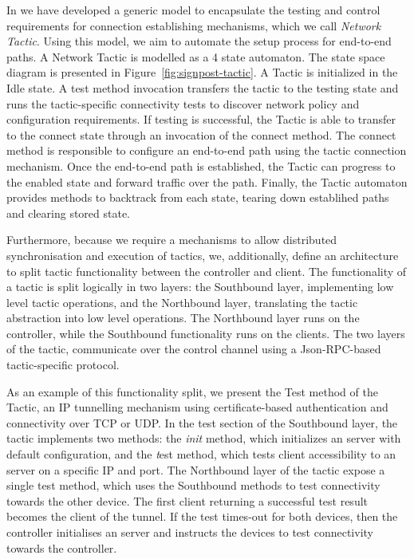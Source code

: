 In \signpost  we have developed a generic model to encapsulate the testing and
control requirements for connection establishing mechanisms, which we call {\it
  Network Tactic}. Using this model, we aim to automate the setup process for
end-to-end paths.  A \signpost Network Tactic is modelled as a 4 state
automaton.  The state space diagram is presented in
Figure~\ref{fig:signpost-tactic}. A Tactic is initialized in the Idle state. A test
method invocation transfers the tactic to the testing state and runs the
tactic-specific connectivity tests to discover network policy and configuration
requirements.  If testing is successful, the Tactic is able to transfer to the
connect state through an invocation of the connect method. The connect method is
responsible to configure an end-to-end path using the tactic connection
mechanism. Once the end-to-end path is established, the Tactic can progress to the
enabled state and forward traffic over the path.  Finally, the Tactic automaton
provides methods to backtrack from each state, tearing down establihed paths and
clearing stored state. 

Furthermore, because we require a mechanisms to allow distributed
synchronisation and execution of tactics, we, additionally, define an
architecture to split tactic functionality between the \signpost controller and
client.  The functionality of a \signpost tactic is split logically in two
layers: the Southbound layer, implementing low level tactic operations, and the
Northbound layer, translating the tactic abstraction into low level operations.
The Northbound layer runs on the \signpost controller, while the
Southbound functionality runs on the \signpost clients.  The two layers of the
tactic, communicate over the control channel using a Json-RPC-based 
tactic-specific protocol. 

As an example of this functionality split, we present the Test method of the
\openvpn Tactic, an IP tunnelling mechanism using certificate-based
authentication and connectivity over TCP or UDP\@. In the test section of the
Southbound layer, the tactic implements two methods: the {\it init} method,
which initializes an \openvpn
server with default configuration, and the {\emph test} method, which tests client accessibility to
an \openvpn server on a specific IP and port. The Northbound layer of the tactic
expose a single test method, which uses the Southbound methods to
test \openvpn connectivity towards the other device. The first
client returning a successful test result becomes the client of the \openvpn
tunnel. If the test times-out for both devices, then the controller initialises
an \openvpn server and instructs the devices to test \openvpn connectivity
towards the controller.

